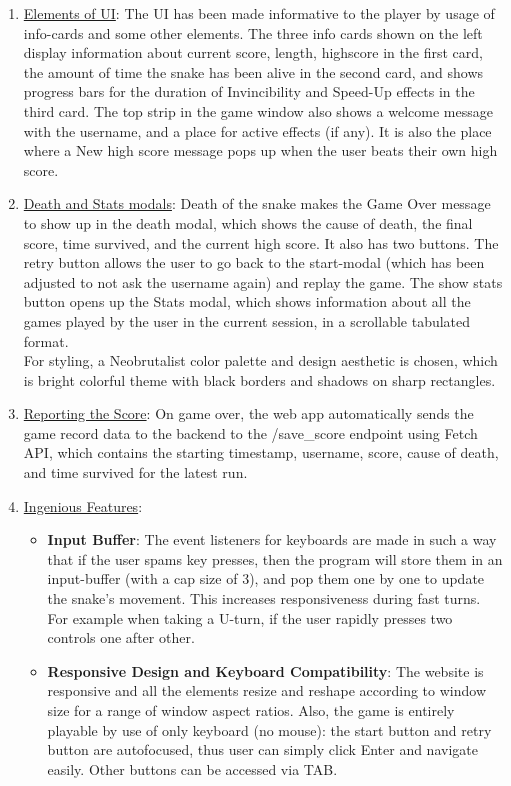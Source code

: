 \documentclass[12pt]{article}
\begin{document}
\begin{enumerate}
    \item \underline{Elements of UI}:
    The UI has been made informative to the player by usage of info-cards and some other elements. The three info cards shown on the left display information about current score, length, highscore in the first card, the amount of time the snake has been alive in the second card, and shows progress bars for the duration of Invincibility and Speed-Up effects in the third card.
    The top strip in the game window also shows a welcome message with the username, and a place for active effects (if any). It is also the place where a New high score message pops up when the user beats their own high score.
    
    \item \underline{Death and Stats modals}:
    Death of the snake makes the Game Over message to show up in the death modal, which shows the cause of death, the final score, time survived, and the current high score. It also has two buttons. The retry button allows the user to go back to the start-modal (which has been adjusted to not ask the username again) and replay the game. The show stats button opens up the Stats modal, which shows information about all the games played by the user in the current session, in a scrollable tabulated format.\\
    For styling, a Neobrutalist color palette and design aesthetic is chosen, which is bright colorful theme with black borders and shadows on sharp rectangles.

    \item \underline{Reporting the Score}:
    On game over, the web app automatically sends the game record data to the backend to the /save\_score endpoint using Fetch API, which contains the starting timestamp, username, score, cause of death, and time survived for the latest run.

    \item \underline{Ingenious Features}:
    \begin{itemize}
        \item \textbf{Input Buffer}: The event listeners for keyboards are made in such a way that if the user spams key presses, then the program will store them in an input-buffer (with a cap size of 3), and pop them one by one to update the snake's movement. This increases responsiveness during fast turns. For example when taking a U-turn, if the user rapidly presses two controls one after other.
        \item \textbf{Responsive Design and Keyboard Compatibility}: The website is responsive and all the elements resize and reshape according to window size for a range of window aspect ratios. Also, the game is entirely playable by use of only keyboard (no mouse): the start button and retry button are autofocused, thus user can simply click Enter and navigate easily. Other buttons can be accessed via TAB.
    \end{itemize}
\end{enumerate}
\end{document}
